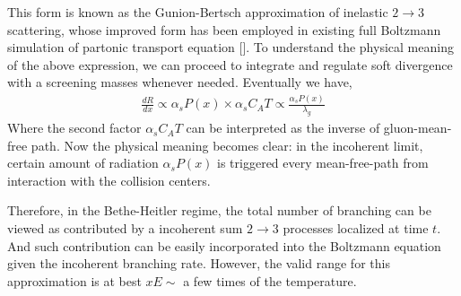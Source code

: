 This form is known as the Gunion-Bertsch approximation of inelastic $2\rightarrow 3$ scattering, whose improved form has been employed in existing full Boltzmann simulation of partonic transport equation [].
To understand the physical meaning of the above expression, we can proceed to integrate and regulate soft divergence with a screening masses whenever needed.
Eventually we have,
\begin{eqnarray}
\frac{dR}{dx} \propto \alpha_s P(x) \times \alpha_s C_A T \propto \frac{\alpha_s P(x)}{\lambda_g}
\end{eqnarray}
Where the second factor $\alpha_s C_A T$ can be interpreted as the inverse of gluon-mean-free path. 
Now the physical meaning becomes clear: in the incoherent limit, certain amount of radiation $\alpha_s P(x)$ is triggered every mean-free-path from interaction with the collision centers.

Therefore, in the Bethe-Heitler regime, the total number of branching can be viewed as contributed by a incoherent sum $2\rightarrow 3$ processes localized at time $t$.
And such contribution can be easily incorporated into the Boltzmann equation given the incoherent branching rate.
However, the valid range for this approximation is at best $x E \sim$ a few times of the temperature.


